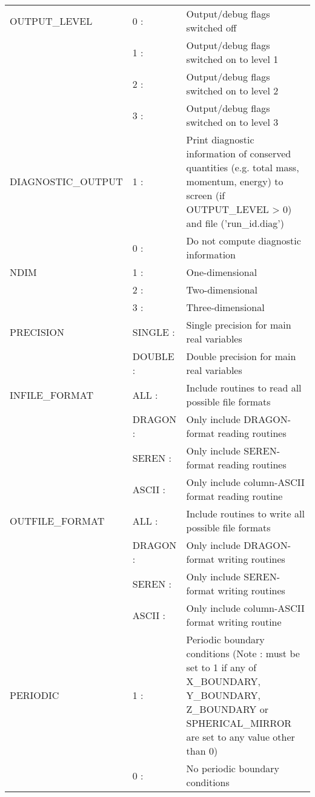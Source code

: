 \documentclass[a4paper]{article}
\begin{document}
\begin{center}
\begin{supertabular}{|p{4.6cm}|p{4.6cm} p{6.4cm}|}
 OUTPUT\_LEVEL & 0 :& Output/debug flags switched off \\
               & 1 :& Output/debug flags switched on to level 1 \\
               & 2 :& Output/debug flags switched on to level 2 \\
               & 3 :& Output/debug flags switched on to level 3 \\ \hline

 DIAGNOSTIC\_OUTPUT & 1 :& Print diagnostic information of conserved quantities (e.g. total mass, momentum, energy) to screen (if OUTPUT\_LEVEL > 0) and file ('run\_id.diag') \\
                    & 0 :& Do not compute diagnostic information \\ \hline

 NDIM          & 1 :& One-dimensional \\
               & 2 :& Two-dimensional \\
               & 3 :& Three-dimensional \\ \hline

 PRECISION     & SINGLE :& Single precision for main real variables \\
               & DOUBLE :& Double precision for main real variables \\ \hline

 INFILE\_FORMAT & ALL       :& Include routines to read all possible file formats \\
                & DRAGON    :& Only include DRAGON-format reading routines \\
                & SEREN     :& Only include SEREN-format reading routines \\
                & ASCII     :& Only include column-ASCII format reading routine \\ \hline

 OUTFILE\_FORMAT & ALL       :& Include routines to write all possible file formats \\
                 & DRAGON    :& Only include DRAGON-format writing routines \\
                 & SEREN     :& Only include SEREN-format writing routines \\ 
                 & ASCII     :& Only include column-ASCII format writing routine \\ \hline

 PERIODIC      & 1 :& Periodic boundary conditions (Note : must be set to 1 if any of X\_BOUNDARY, Y\_BOUNDARY, Z\_BOUNDARY or SPHERICAL\_MIRROR are set to any value other than 0) \\
               & 0 :& No periodic boundary conditions \\ \hline


\end{supertabular}
\end{center}
\end{document}
